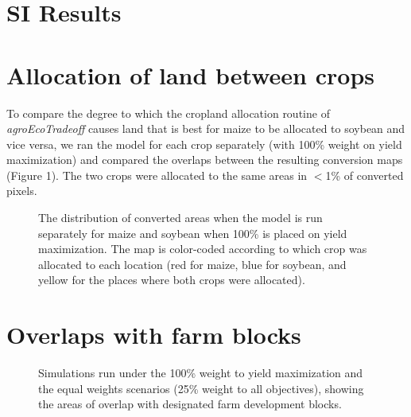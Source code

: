\documentclass[a4paper]{article}
\begin{document}
\section*{\Large SI Results}

\section*{\large Allocation of land between crops}

To compare the degree to which the cropland allocation routine of \emph{agroEcoTradeoff} causes land that is best for maize to be allocated to soybean and vice versa, we ran the model for each crop separately (with 100\% weight on yield maximization) and compared the overlaps between the resulting conversion maps (Figure 1). The two crops were allocated to the same areas in $<$1\% of converted pixels. 

\begin{figure}[!ht]
\captionsetup{width=0.95\linewidth, font=small}
       \begin{center}
        \end{center}
      \caption{The distribution of converted areas when the model is run separately for maize and soybean when 100\% is placed on yield maximization. The map is color-coded according to which crop was allocated to each location (red for maize, blue for soybean, and yellow for the places where both crops were allocated).}
      \label{fig:default}
\end{figure}

\section*{\large Overlaps with farm blocks}

\begin{figure}[!ht]
\captionsetup{width=0.95\linewidth, font=small}
       \begin{center}
        \end{center}
      \caption{Simulations run under the 100\% weight to yield maximization and the equal weights scenarios (25\% weight to all objectives), showing the areas of overlap with designated farm development blocks. }
      \label{fig:default}
\end{figure}
\end{document}
